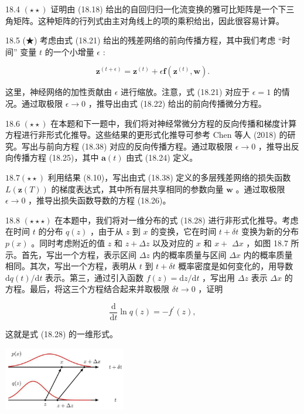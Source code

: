 \documentclass[10pt]{report}
\begin{document}
18.4 \(\left( {\star  \star  }\right)\) 证明由 (18.18) 给出的自回归归一化流变换的雅可比矩阵是一个下三角矩阵。这种矩阵的行列式由主对角线上的项的乘积给出，因此很容易计算。

18.5 (★) 考虑由式 (18.21) 给出的残差网络的前向传播方程，其中我们考虑 “时间” 变量 \(t\) 的一个小增量 \(\epsilon\) :

\[
{\mathbf{z}}^{\left( t + \epsilon \right) } = {\mathbf{z}}^{\left( t\right) } + \epsilon \mathbf{f}\left( {{\mathbf{z}}^{\left( t\right) },\mathbf{w}}\right) . \tag{18.38}
\]

这里，神经网络的加性贡献由 \(\epsilon\) 进行缩放。注意，式 (18.21) 对应于 \(\epsilon  = 1\) 的情况。通过取极限 \(\epsilon  \rightarrow  0\) ，推导出由式 (18.22) 给出的前向传播微分方程。

18.6 \(\left( {\star  \star  }\right)\) 在本题和下一题中，我们将对神经常微分方程的反向传播和梯度计算方程进行非形式化推导。这些结果的更形式化推导可参考 Chen 等人 (2018) 的研究。写出与前向方程 (18.38) 对应的反向传播方程。通过取极限 \(\epsilon  \rightarrow  0\) ，推导出反向传播方程 (18.25)，其中 \(\mathbf{a}\left( t\right)\) 由式 (18.24) 定义。

\({18.7}\left( {\star  \star  }\right)\) 利用结果 (8.10)，写出由式 (18.38) 定义的多层残差网络的损失函数 \(L\left( {\mathbf{z}\left( T\right) }\right)\) 的梯度表达式，其中所有层共享相同的参数向量 \(\mathbf{w}\) 。通过取极限 \(\epsilon  \rightarrow  0\) ，推导出损失函数导数的方程 (18.26)。

18.8 \(\left( {\star  \star   \star  }\right)\) 在本题中，我们将对一维分布的式 (18.28) 进行非形式化推导。考虑在时间 \(t\) 的分布 \(q\left( z\right)\) ，由于从 \(z\) 到 \(x\) 的变换，它在时间 \(t + {\delta t}\) 变换为新的分布 \(p\left( x\right)\) 。同时考虑附近的值 \(z\) 和 \(z + {\Delta z}\) 以及对应的 \(x\) 和 \(x +\)  \({\Delta x}\) ，如图 18.7 所示。首先，写出一个方程，表示区间 \({\Delta z}\) 内的概率质量与区间 \({\Delta x}\) 内的概率质量相同。其次，写出一个方程，表明从 \(t\) 到 \(t + {\delta t}\) 概率密度是如何变化的，用导数 \(\mathrm{d}q\left( t\right) /\mathrm{d}t\) 表示。第三，通过引入函数 \(f\left( z\right)  = \mathrm{d}z/\mathrm{d}t\) ，写出用 \({\Delta z}\) 表示 \({\Delta x}\) 的方程。最后，将这三个方程结合起来并取极限 \({\delta t} \rightarrow  0\) ，证明

\[
\frac{\mathrm{d}}{\mathrm{d}t}\ln q\left( z\right)  =  - {f}^{\prime }\left( z\right) , \tag{18.39}
\]

这就是式 (18.28) 的一维形式。

\begin{center}
\includegraphics[max width=0.4\textwidth]{images/0194e279-9b28-703a-88f4-c3ac21e2010d_579_928_1265_616_318_0.jpg}
\end{center}
\hspace*{3em} 
\end{document}
